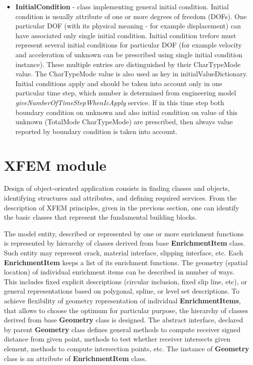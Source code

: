\documentclass[a4paper]{article}
\newcommand{\class}[1]{{\bf #1}}
\newcommand{\service}[1]{{\em #1}}
\newcommand{\attribute}[1]{#1}
\begin{document}
\begin{itemize}
\item
\class{InitialCondition} - class implementing general initial condition. Initial condition is usually attribute of
one or more degrees of freedom (DOFs). One particular DOF (with its
physical meaning - for example displacement) can have associated only
single initial condition.	Initial condition trefore must represent
several initial conditions for particular DOF (for example velocity
and acceleration of unknown can be prescribed using single initial
condition instance). These multiple entries are distinguished by their
CharTypeMode value.	The CharTypeMode value is also used as key in
\attribute{initialValueDictionary}.
Initial conditions apply and should be taken into account	only in one
particular time step, which number is determined from engineering
model	\service{giveNumberOfTimeStepWhenIcApply} service. If in this
time step both boundary condition on unknown and also initial
condition on value of this unknown (TotalMode CharTypeMode) are
prescribed, then always value reported by boundary condition is taken
into account.
\end{itemize}


\section{XFEM module}

Design of object-oriented application consists in finding classes and objects, identifying structures and attributes, and defining required services. From the description of XFEM principles, given in the previous section, one can identify the basic classes that represent the fundamental building blocks. 

The model entity, described or represented by one or more enrichment functions is represented by hierarchy of classes derived from base \class{EnrichmentItem} class. Such entity may represent crack, material interface, slipping interface, etc. Each \class{EnrichmentItem} keeps a list of its enrichment functions. The geometry (spatial location) of individual enrichment items can be described in number of ways. This includes fixed explicit descriptions (circular inclusion, fixed slip line, etc), or general representations based on polygonal, spline, or level set descriptions. To achieve flexibility of geometry representation of individual \class{EnrichmentItems}, that allows to choose the optimum for particular purpose, the hierarchy of classes derived from base \class{Geometry} class is designed. The abstract interface, declared by parent \class{Geometry} class defines general methods to compute receiver signed distance from given point, methods to test whether receiver intersects given element, methods to compute intersection points, etc. The instance of \class{Geometry} class is an attribute of \class{EnrichmentItem} class.
\end{document}
